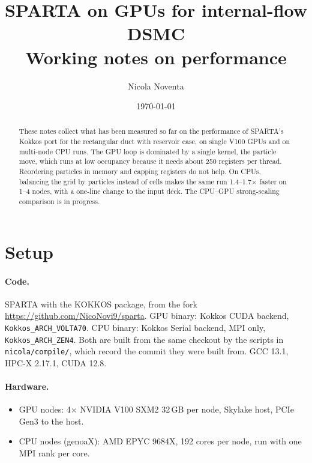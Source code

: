 \documentclass[11pt,a4paper]{article}
\title{SPARTA on GPUs for internal-flow DSMC\\\large Working notes on performance}
\author{Nicola Noventa}
\date{\today}
\newcommand{\code}[1]{\texttt{#1}}
\begin{document}
\maketitle

\begin{abstract}
These notes collect what has been measured so far on the performance of
SPARTA's Kokkos port for the rectangular duct with reservoir case, on single
V100 GPUs and on multi-node CPU runs. The GPU loop is dominated by a single
kernel, the particle move, which runs at low occupancy because it needs about
250 registers per thread. Reordering particles in memory and capping registers
do not help. On CPUs, balancing the grid by particles instead of cells makes the
same run 1.4--1.7$\times$ faster on 1--4 nodes, with a one-line change to the
input deck. The CPU--GPU strong-scaling comparison is in progress.
\end{abstract}

\tableofcontents

\section{Setup}

\paragraph{Code.} SPARTA with the KOKKOS package, from the fork
\url{https://github.com/NicoNovi9/sparta}. GPU binary: Kokkos CUDA backend,
\code{Kokkos\_ARCH\_VOLTA70}. CPU binary: Kokkos Serial backend, MPI only,
\code{Kokkos\_ARCH\_ZEN4}. Both are built from the same checkout by the scripts
in \code{nicola/compile/}, which record the commit they were built from.
GCC 13.1, HPC-X 2.17.1, CUDA 12.8.

\paragraph{Hardware.}
\begin{itemize}
  \item GPU nodes: 4$\times$ NVIDIA V100 SXM2 32\,GB per node, Skylake host,
        PCIe Gen3 to the host.
  \item CPU nodes (genoaX): AMD EPYC 9684X, 192 cores per node, run with one MPI
        rank per core.
\end{itemize}
\end{document}
